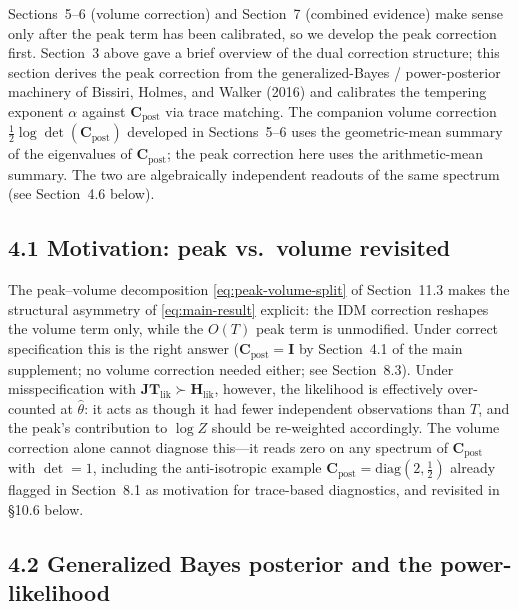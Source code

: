 \documentclass[11pt]{article}
\begin{document}
Sections~5--6 (volume correction) and Section~7 (combined evidence) make sense only after the peak term has been calibrated, so we develop the peak correction first. Section~3 above gave a brief overview of the dual correction structure; this section derives the peak correction from the generalized-Bayes / power-posterior machinery of Bissiri, Holmes, and Walker (2016) and calibrates the tempering exponent $\alpha$ against $\mathbf C_{\mathrm{post}}$ via trace matching. The companion volume correction $\tfrac{1}{2}\log\det(\mathbf C_{\mathrm{post}})$ developed in Sections~5--6 uses the geometric-mean summary of the eigenvalues of $\mathbf C_{\mathrm{post}}$; the peak correction here uses the arithmetic-mean summary. The two are algebraically independent readouts of the same spectrum (see Section~4.6 below).

\subsection*{4.1 Motivation: peak vs.\ volume revisited}

The peak--volume decomposition \eqref{eq:peak-volume-split} of Section~11.3
makes the structural asymmetry of \eqref{eq:main-result} explicit: the IDM
correction reshapes the volume term only, while the $O(T)$ peak term is
unmodified. Under correct specification this is the right answer
($\mathbf C_{\mathrm{post}} = \mathbf I$ by Section~4.1 of the main supplement;
no volume correction needed either; see Section~8.3). Under misspecification with
$\mathbf{JT}_{\mathrm{lik}} \succ \mathbf H_{\mathrm{lik}}$, however, the
likelihood is effectively over-counted at $\hat\theta$: it acts as though it had
fewer independent observations than $T$, and the peak's contribution to $\log Z$
should be re-weighted accordingly. The volume correction alone cannot diagnose
this---it reads zero on any spectrum of $\mathbf C_{\mathrm{post}}$ with
$\det = 1$, including the anti-isotropic example $\mathbf C_{\mathrm{post}}
= \mathrm{diag}(2,\tfrac{1}{2})$ already flagged in Section~8.1 as motivation
for trace-based diagnostics, and revisited in \S10.6 below.

\subsection*{4.2 Generalized Bayes posterior and the power-likelihood}
\end{document}
